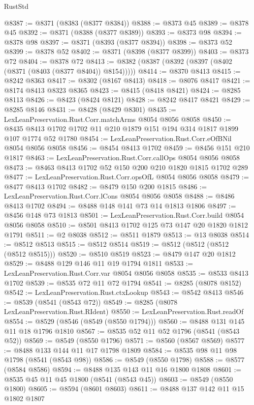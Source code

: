 \begin{lexlean}{RustStd}
\begin{coremodule}
@8387 := @8371 (@8383 (@8377 @8384))
@8388 := @8373 @45
@8389 := @8378 @45
@8392 := @8371 (@8388 (@8377 @8389))
@8393 := @8373 @98
@8394 := @8378 @98
@8397 := @8371 (@8393 (@8377 @8394))
@8398 := @8373 @52
@8399 := @8378 @52
@8402 := @8371 (@8398 (@8377 @8399))
@8403 := @8373 @72
@8404 := @8378 @72
@8413 := @8382 (@8387 (@8392 (@8397 (@8402 (@8371 (@8403 (@8377 @8404)) @8154)))))
@8414 := @8370 @8413
@8415 := @8242 @8363
@8417 := @8302 (@8167 @8413)
@8418 := @8076 @8417
@8421 := @8174 @8413 @8323 @8365
@8423 := @8415 (@8418 @8421)
@8424 := @8285 @8113
@8426 := @8423 (@8424 @8121)
@8428 := @8242 @8417 @8421
@8429 := @8285 @8146
@8431 := @8428 (@8429 @8301)
@8435 := LexLeanPreservation.Rust.Corr.matchArms @8054 @8056 @8058
@8450 := @8435 @8413 @1702 @1702 @11 @210 @1879 @151 @194 @314 @1817 @1899 @107 @1774 @52 @1780
@8454 := LexLeanPreservation.Rust.Corr.eOfBNil @8054 @8056 @8058
@8456 := @8454 @8413 @1702
@8459 := @8456 @151 @210 @1817
@8463 := LexLeanPreservation.Rust.Corr.callOps @8054 @8056 @8058
@8473 := @8463 @8413 @1702 @52 @150 @200 @210 @1820 @1815 @1702 @289
@8477 := LexLeanPreservation.Rust.Corr.opsOfL @8054 @8056 @8058
@8479 := @8477 @8413 @1702
@8482 := @8479 @150 @200 @1815
@8486 := LexLeanPreservation.Rust.Corr.lCons @8054 @8056 @8058
@8488 := @8486 @8413 @1702
@8494 := @8488 @148 @141 @73 @14 @1813 @1806
@8497 := @8456 @148 @73 @1813
@8501 := LexLeanPreservation.Rust.Corr.build @8054 @8056 @8058
@8510 := @8501 @8413 @1702 @125 @73 @147 @20 @1820 @1812 @1791
@8511 := @2 @8038
@8512 := @8511 @1879
@8513 := @13 @8038
@8514 := @8512 @8513
@8515 := @8512 @8514
@8519 := @8512 (@8512 (@8512 (@8512 @8515)))
@8520 := @8510 @8519
@8523 := @8479 @147 @20 @1812
@8529 := @8488 @129 @146 @11 @19 @1794 @1811
@8533 := LexLeanPreservation.Rust.Corr.var @8054 @8056 @8058
@8535 := @8533 @8413 @1702
@8539 := @8535 @72 @11 @72 @1794
@8541 := @8285 (@8078 @8152)
@8542 := LexLeanPreservation.Rust.ctxLookup
@8543 := @8542 @8413
@8546 := @8539 (@8541 (@8543 @72))
@8549 := @8285 (@8078 LexLeanPreservation.Rust.RIdent)
@8550 := LexLeanPreservation.Rust.readOf
@8554 := @8529 (@8546 (@8549 (@8550 @1794)))
@8560 := @8488 @131 @145 @11 @18 @1796 @1810
@8567 := @8535 @52 @11 @52 @1796 (@8541 (@8543 @52))
@8569 := @8549 (@8550 @1796)
@8571 := @8560 (@8567 @8569)
@8577 := @8488 @133 @144 @11 @17 @1798 @1809
@8584 := @8535 @98 @11 @98 @1798 (@8541 (@8543 @98))
@8586 := @8549 (@8550 @1798)
@8588 := @8577 (@8584 @8586)
@8594 := @8488 @135 @143 @11 @16 @1800 @1808
@8601 := @8535 @45 @11 @45 @1800 (@8541 (@8543 @45))
@8603 := @8549 (@8550 @1800)
@8605 := @8594 (@8601 @8603)
@8611 := @8488 @137 @142 @11 @15 @1802 @1807

\end{coremodule}
\end{lexlean}
